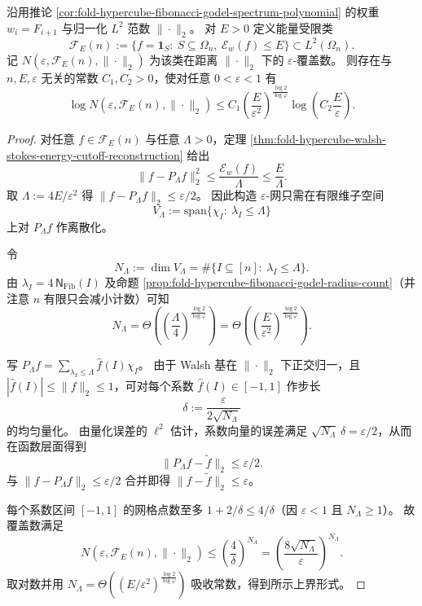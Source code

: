 \begin{theorem}\label{thm:fold-hypercube-fibonacci-eps-entropy-upper}
沿用推论 \ref{cor:fold-hypercube-fibonacci-godel-spectrum-polynomial} 的权重 \(w_i=F_{i+1}\) 与归一化 \(L^2\) 范数 \(\|\cdot\|_2\)。
对 \(E>0\) 定义能量受限类
\[
\mathcal F_E(n):=\{f=\mathbf 1_S:\ S\subseteq\Omega_n,\ \mathcal E_w(f)\le E\}\subset L^2(\Omega_n).
\]
记 \(N(\varepsilon,\mathcal F_E(n),\|\cdot\|_2)\) 为该类在距离 \(\|\cdot\|_2\) 下的 \(\varepsilon\)-覆盖数。
则存在与 \(n,E,\varepsilon\) 无关的常数 \(C_1,C_2>0\)，使对任意 \(0<\varepsilon<1\) 有
\[
\log N(\varepsilon,\mathcal F_E(n),\|\cdot\|_2)
\le
C_1\left(\frac{E}{\varepsilon^2}\right)^{\frac{\log 2}{\log\varphi}}
\log\!\left(C_2\frac{E}{\varepsilon}\right).
\]
\end{theorem}
\begin{proof}
对任意 \(f\in\mathcal F_E(n)\) 与任意 \(\Lambda>0\)，定理 \ref{thm:fold-hypercube-walsh-stokes-energy-cutoff-reconstruction} 给出
\[
\|f-P_\Lambda f\|_2^2\le \frac{\mathcal E_w(f)}{\Lambda}\le \frac{E}{\Lambda}.
\]
取 \(\Lambda:=4E/\varepsilon^2\) 得 \(\|f-P_\Lambda f\|_2\le \varepsilon/2\)。
因此构造 \(\varepsilon\)-网只需在有限维子空间
\[
V_\Lambda:=\mathrm{span}\{\chi_I:\ \lambda_I\le \Lambda\}
\]
上对 \(P_\Lambda f\) 作离散化。
\par
令
\[
N_\Lambda:=\dim V_\Lambda=\#\{I\subseteq[n]:\ \lambda_I\le \Lambda\}.
\]
由 \(\lambda_I=4\,\mathsf N_{\mathrm{Fib}}(I)\) 及命题 \ref{prop:fold-hypercube-fibonacci-godel-radius-count}（并注意 \(n\) 有限只会减小计数）可知
\[
N_\Lambda=\Theta\!\left(\left(\frac{\Lambda}{4}\right)^{\frac{\log 2}{\log\varphi}}\right)
=\Theta\!\left(\left(\frac{E}{\varepsilon^2}\right)^{\frac{\log 2}{\log\varphi}}\right).
\]
\par
写 \(P_\Lambda f=\sum_{\lambda_I\le \Lambda}\widehat f(I)\chi_I\)。
由于 Walsh 基在 \(\|\cdot\|_2\) 下正交归一，且 \(|\widehat f(I)|\le \|f\|_2\le 1\)，可对每个系数 \(\widehat f(I)\in[-1,1]\) 作步长
\[
\delta:=\frac{\varepsilon}{2\sqrt{N_\Lambda}}
\]
的均匀量化。
由量化误差的 \(\ell^2\) 估计，系数向量的误差满足
\(
\sqrt{N_\Lambda}\,\delta=\varepsilon/2
\)，从而在函数层面得到
\[
\|P_\Lambda f-\widetilde f\|_2\le \varepsilon/2.
\]
与 \(\|f-P_\Lambda f\|_2\le \varepsilon/2\) 合并即得 \(\|f-\widetilde f\|_2\le \varepsilon\)。
\par
每个系数区间 \([-1,1]\) 的网格点数至多 \(1+2/\delta\le 4/\delta\)（因 \(\varepsilon<1\) 且 \(N_\Lambda\ge 1\)）。
故覆盖数满足
\[
N(\varepsilon,\mathcal F_E(n),\|\cdot\|_2)
\le
\left(\frac{4}{\delta}\right)^{N_\Lambda}
=
\left(\frac{8\sqrt{N_\Lambda}}{\varepsilon}\right)^{N_\Lambda}.
\]
取对数并用 \(N_\Lambda=\Theta((E/\varepsilon^2)^{\frac{\log 2}{\log\varphi}})\) 吸收常数，得到所示上界形式。
\end{proof}

